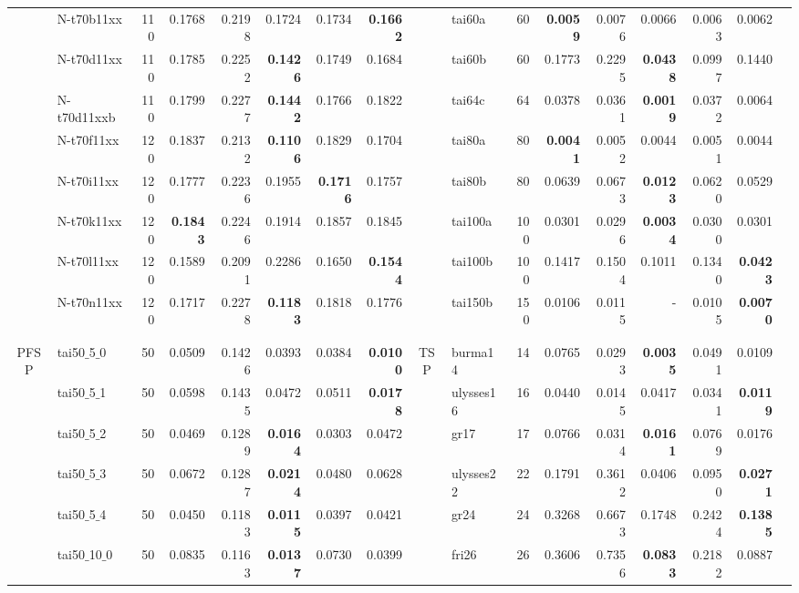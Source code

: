 \documentclass[conference]{IEEEtran}
\begin{document}
\begin{table}[hbt]
{\begin{tabular}{clrrrrrr | clrrrrrrr}
 & N-t70b11xx & 110 & 0.1768 & 0.2198 & 0.1724 & 0.1734 & {\bf 0.1662} &  & tai60a & 60 & {\bf 0.0059} & 0.0076 & 0.0066 & 0.0063 & 0.0062\\
 & N-t70d11xx & 110 & 0.1785 & 0.2252 & {\bf 0.1426} & 0.1749 & 0.1684 &  & tai60b & 60 & 0.1773 & 0.2295 & {\bf 0.0438} & 0.0997 & 0.1440\\
 & N-t70d11xxb & 110 & 0.1799 & 0.2277 & {\bf 0.1442} & 0.1766 & 0.1822 &  & tai64c & 64 & 0.0378 & 0.0361 & {\bf 0.0019} & 0.0372 & 0.0064\\
 & N-t70f11xx & 120 & 0.1837 & 0.2132 & {\bf 0.1106} & 0.1829 & 0.1704 &  & tai80a & 80 & {\bf 0.0041} & 0.0052 & 0.0044 & 0.0051 & 0.0044\\
 & N-t70i11xx & 120 & 0.1777 & 0.2236 & 0.1955 & {\bf 0.1716} & 0.1757 &  & tai80b & 80 & 0.0639 & 0.0673 & {\bf 0.0123} & 0.0620 & 0.0529\\
 & N-t70k11xx & 120 & {\bf 0.1843} & 0.2246 & 0.1914 & 0.1857 & 0.1845 &  & tai100a & 100 & 0.0301 & 0.0296 & {\bf 0.0034} & 0.0300 & 0.0301\\
 & N-t70l11xx & 120 & 0.1589 & 0.2091 & 0.2286 & 0.1650 & {\bf 0.1544} &  & tai100b & 100 & 0.1417 & 0.1504 & 0.1011 & 0.1340 & {\bf 0.0423}\\
 & N-t70n11xx & 120 & 0.1717 & 0.2278 & {\bf 0.1183} & 0.1818 & 0.1776 &  & tai150b & 150 & 0.0106 & 0.0115 & - & 0.0105 & {\bf 0.0070}\\ 
& & & & & & & &  \\
   \hdashline[1pt/2pt] 
& & & & & & & &   \\
PFSP & tai50$\_$5$\_$0 & 50 & 0.0509 & 0.1426 & 0.0393 & 0.0384 & {\bf 0.0100} & TSP & burma14 & 14 & 0.0765 & 0.0293 & {\bf 0.0035} & 0.0491 & 0.0109\\
 & tai50$\_$5$\_$1 & 50 & 0.0598 & 0.1435 & 0.0472 & 0.0511 & {\bf 0.0178} &  & ulysses16 & 16 & 0.0440 & 0.0145 & 0.0417 & 0.0341 & {\bf 0.0119}\\
 & tai50$\_$5$\_$2 & 50 & 0.0469 & 0.1289 & {\bf 0.0164} & 0.0303 & 0.0472 &  & gr17 & 17 & 0.0766 & 0.0314 & {\bf 0.0161} & 0.0769 & 0.0176\\
 & tai50$\_$5$\_$3 & 50 & 0.0672 & 0.1287 & {\bf 0.0214} & 0.0480 & 0.0628 &  & ulysses22 & 22 & 0.1791 & 0.3612 & 0.0406 & 0.0950 & {\bf 0.0271}\\
 & tai50$\_$5$\_$4 & 50 & 0.0450 & 0.1183 & {\bf 0.0115} & 0.0397 & 0.0421 &  & gr24 & 24 & 0.3268 & 0.6673 & 0.1748 & 0.2424 & {\bf 0.1385}\\
 & tai50$\_$10$\_$0 & 50 & 0.0835 & 0.1163 & {\bf 0.0137} & 0.0730 & 0.0399 &  & fri26 & 26 & 0.3606 & 0.7356 & {\bf 0.0833} & 0.2182 & 0.0887\\

\end{tabular}}
\end{table}
\end{document}
